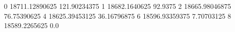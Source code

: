 0 18711.12890625 121.90234375
1 18682.1640625 92.9375
2 18665.98046875 76.75390625
4 18625.39453125 36.16796875
6 18596.93359375 7.70703125
8 18589.2265625 0.0
